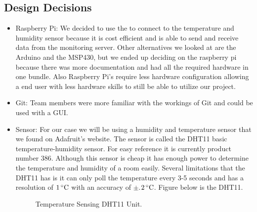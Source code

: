 \documentclass{report}
\begin{document}
\subsection*{Design Decisions}
\begin{itemize}
\item Raspberry Pi: We decided to use the to connect to the temperature and humidity sensor because it is cost efficient and is able to send and receive data from the monitoring server. 
Other alternatives we looked at are the Arduino and the MSP430, but we ended up deciding on the raspberry pi because there was more documentation and had all the required hardware in one bundle.
Also Raspberry Pi’s require less hardware configuration allowing a end user with less hardware skills to still be able to utilize our project.
\item Git: Team members were more familiar with the workings of Git and could be used with a GUI.
\item Sensor: For our case we will be using a humidity and temperature sensor that we found on Adafruit's website.
The sensor is called the DHT11 basic temperature-humidity sensor. 
For easy reference it is currently product number 386.
Although this sensor is cheap it has enough power to determine the temperature and humidity of a room easily.
Several limitations that the DHT11 has is it can only poll the temperature every 3-5 seconds and has a resolution of $1\,^{\circ}{\rm C}$ with an accuracy of $\pm$.$2\,^{\circ}{\rm C}$. 
Figure below is the DHT11.

\begin{figure}[H]
\caption{Temperature Sensing DHT11 Unit.}
\end{figure}


\end{itemize}
\end{document}
